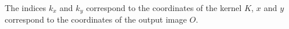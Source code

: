 The indices $k_x$ and $k_y$ correspond to the coordinates of the kernel $K$, $x$ and $y$ correspond to the coordinates of the output image $O$. 










